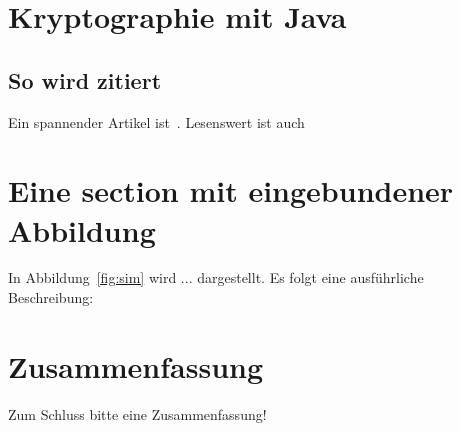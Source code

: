 \documentclass[paper=a4,11pt,german]{scrartcl} %
\begin{document}
\section{Kryptographie mit Java}

\subsection{So wird zitiert}
Ein spannender Artikel ist~\cite{LSSZ08}. Lesenswert ist auch~\cite{oasa_mediawiki}

\section{Eine section mit eingebundener Abbildung}

In Abbildung~\ref{fig:sim} wird ... dargestellt. Es folgt eine
ausführliche Beschreibung:


\section{Zusammenfassung}
Zum Schluss bitte eine Zusammenfassung!



\end{document}
